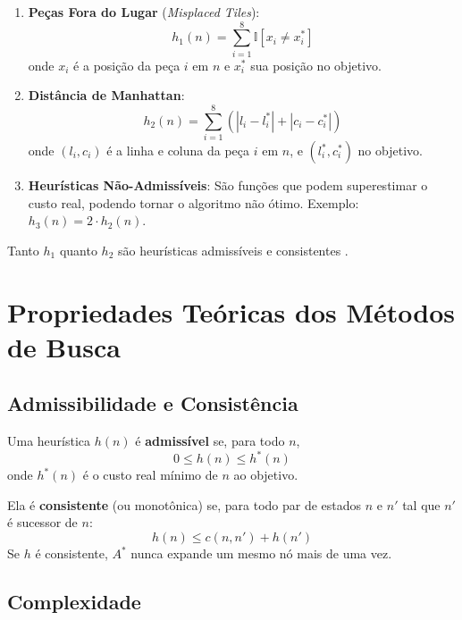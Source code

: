 \begin{enumerate}[label=(\alph*)]  
    \item \textbf{Peças Fora do Lugar} (\emph{Misplaced Tiles}):  
    \begin{equation}  
        h_1(n) = \sum_{i=1}^{8} \mathbb{I}[x_i \neq x_i^*]  
    \end{equation}  
    onde $x_i$ é a posição da peça $i$ em $n$ e $x_i^*$ sua posição no objetivo.  
  
    \item \textbf{Distância de Manhattan}:  
    \begin{equation}  
        h_2(n) = \sum_{i=1}^{8} \left( |l_i - l_i^*| + |c_i - c_i^*| \right)  
    \end{equation}  
    onde $(l_i, c_i)$ é a linha e coluna da peça $i$ em $n$, e $(l_i^*, c_i^*)$ no objetivo.  
  
    \item \textbf{Heurísticas Não-Admissíveis}: São funções que podem superestimar o custo real, podendo tornar o algoritmo não ótimo. Exemplo: $h_3(n) = 2 \cdot h_2(n)$.  
\end{enumerate}  
  
Tanto $h_1$ quanto $h_2$ são heurísticas admissíveis e consistentes \cite{russell2010artificial}.  
  
\section{Propriedades Teóricas dos Métodos de Busca}  
  
\subsection{Admissibilidade e Consistência}  
  
Uma heurística $h(n)$ é \textbf{admissível} se, para todo $n$,  
\begin{equation}  
    0 \leq h(n) \leq h^*(n)  
\end{equation}  
onde $h^*(n)$ é o custo real mínimo de $n$ ao objetivo.  
  
Ela é \textbf{consistente} (ou monotônica) se, para todo par de estados $n$ e $n'$ tal que $n'$ é sucessor de $n$:  
\begin{equation}  
    h(n) \leq c(n, n') + h(n')  
\end{equation}  
Se $h$ é consistente, $A^*$ nunca expande um mesmo nó mais de uma vez.  
  
\subsection{Complexidade}  
  
